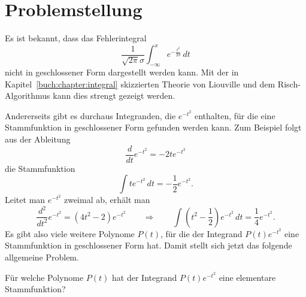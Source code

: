 %
%
%
\section{Problemstellung\label{dreieck:section:problemstellung}}
Es ist bekannt, dass das Fehlerintegral
%
%
\[
\frac{1}{\sqrt{2\pi}\sigma} \int_{-\infty}^x e^{-\frac{t^2}{2\sigma}}\,dt
\]
nicht in geschlossener Form dargestellt werden kann.
Mit der in Kapitel~\ref{buch:chapter:integral} skizzierten Theorie von
Liouville und dem Risch-Algorithmus kann dies strengt gezeigt werden.
%

Andererseits gibt es durchaus Integranden, die $e^{-t^2}$ enthalten,
für die eine Stammfunktion in geschlossener Form gefunden werden kann.
Zum Beispiel folgt aus der Ableitung
\[
\frac{d}{dt} e^{-t^2}
=
-2te^{-t^2}
\]
die Stammfunktion
\[
\int te^{-t^2}\,dt
=
-\frac12 e^{-t^2}.
\]
Leitet man $e^{-t^2}$ zweimal ab, erhält man
\[
\frac{d^2}{dt^2} e^{-t^2}
=
(4t^2-2) e^{-t^2}
\qquad\Rightarrow\qquad
\int (t^2-{\textstyle\frac12}) e^{-t^2}\,dt
=
{\textstyle\frac14}
e^{-t^2}.
\]
Es gibt also viele weitere Polynome $P(t)$, für die der Integrand
$P(t)e^{-t^2}$ eine Stammfunktion in geschlossener Form hat.
Damit stellt sich jetzt das folgende allgemeine Problem.

\begin{problem}
\label{dreieck:problem}
Für welche Polynome $P(t)$ hat der Integrand $P(t)e^{-t^2}$
eine elementare Stammfunktion?
\end{problem}

